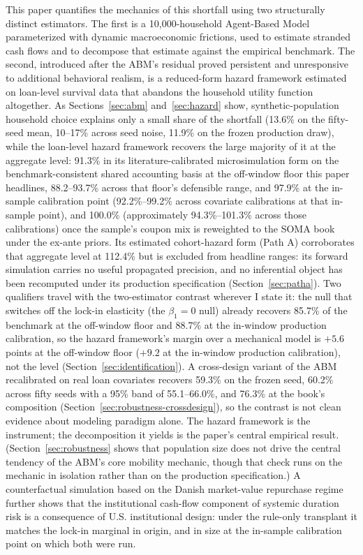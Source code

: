 \documentclass[12pt]{article}
\begin{document}
This paper quantifies the mechanics of this shortfall using two structurally distinct estimators. The first is a 10,000-household Agent-Based Model parameterized with dynamic macroeconomic frictions, used to estimate stranded cash flows and to decompose that estimate against the empirical benchmark. The second, introduced after the ABM's residual proved persistent and unresponsive to additional behavioral realism, is a reduced-form hazard framework estimated on loan-level survival data that abandons the household utility function altogether. As Sections~\ref{sec:abm} and~\ref{sec:hazard} show, synthetic-population household choice explains only a small share of the shortfall (13.6\% on the fifty-seed mean, 10--17\% across seed noise, 11.9\% on the frozen production draw), while the loan-level hazard framework recovers the large majority of it at the aggregate level: 91.3\% in its literature-calibrated microsimulation form on the benchmark-consistent shared accounting basis at the off-window floor this paper headlines, 88.2--93.7\% across that floor's defensible range, and 97.9\% at the in-sample calibration point (92.2\%--99.2\% across covariate calibrations at that in-sample point), and 100.0\% (approximately 94.3\%--101.3\% across those calibrations) once the sample's coupon mix is reweighted to the SOMA book under the ex-ante priors. Its estimated cohort-hazard form (Path A) corroborates that aggregate level at 112.4\% but is excluded from headline ranges: its forward simulation carries no useful propagated precision, and no inferential object has been recomputed under its production specification (Section~\ref{sec:patha}). Two qualifiers travel with the two-estimator contrast wherever I state it: the null that switches off the lock-in elasticity (the $\beta_1 = 0$ null) already recovers 85.7\% of the benchmark at the off-window floor and 88.7\% at the in-window production calibration, so the hazard framework's margin over a mechanical model is $+5.6$ points at the off-window floor ($+9.2$ at the in-window production calibration), not the level (Section~\ref{sec:identification}). A cross-design variant of the ABM recalibrated on real loan covariates recovers 59.3\% on the frozen seed, 60.2\% across fifty seeds with a 95\% band of 55.1--66.0\%, and 76.3\% at the book's composition (Section~\ref{sec:robustness-crossdesign}), so the contrast is not clean evidence about modeling paradigm alone. The hazard framework is the instrument; the decomposition it yields is the paper's central empirical result. (Section~\ref{sec:robustness} shows that population size does not drive the central tendency of the ABM's core mobility mechanic, though that check runs on the mechanic in isolation rather than on the production specification.) A counterfactual simulation based on the Danish market-value repurchase regime further shows that the institutional cash-flow component of systemic duration risk is a consequence of U.S. institutional design: under the rule-only transplant it matches the lock-in marginal in origin, and in size at the in-sample calibration point on which both were run.
\end{document}
